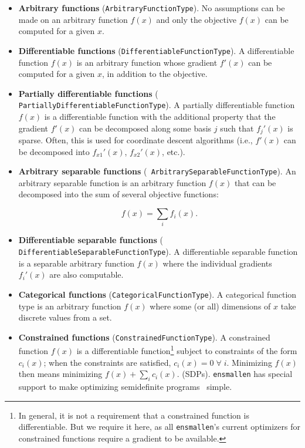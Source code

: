 \begin{itemize}
\item {\bf Arbitrary functions} ({\tt \small ArbitraryFunctionType}).  No
assumptions can be made on an arbitrary function $f(x)$ and only the objective
$f(x)$ can be computed for a given $x$.

\item {\bf Differentiable functions} ({\tt \small DifferentiableFunctionType}).
A differentiable function $f(x)$ is an arbitrary function whose gradient $f'(x)$
can be computed for a given $x$, in addition to the objective.

\item {\bf Partially differentiable functions} ({\tt \small
PartiallyDifferentiableFunctionType}).  A partially differentiable function
$f(x)$ is a differentiable function with the additional property that the
gradient $f'(x)$ can be decomposed along some basis $j$ such that $f_j'(x)$ is
sparse.  Often, this is used for coordinate descent algorithms (i.e., $f'(x)$
can be decomposed into $f_{x1}'(x)$, $f_{x2}'(x)$, etc.).

\item {\bf Arbitrary separable functions} ({\tt \small
ArbitrarySeparableFunctionType}).  An arbitrary separable function is an
arbitrary function $f(x)$ that can be decomposed into the sum of several
objective functions:

\begin{equation}
f(x) = \sum_i f_i(x).
\end{equation}

\item {\bf Differentiable separable functions} ({\tt \small
DifferentiableSeparableFunctionType}).  A differentiable separable function is a
separable arbitrary function $f(x)$ where the individual gradients $f_i'(x)$ are
also computable.

\item {\bf Categorical functions} ({\tt \small CategoricalFunctionType}).  A
categorical function type is an arbitrary function $f(x)$ where some (or all)
dimensions of $x$ take discrete values from a set.

\item {\bf Constrained functions} ({\tt \small ConstrainedFunctionType}).  A
constrained function $f(x)$ is a differentiable function\footnote{In general, it
is not a requirement that a constrained function is differentiable.  But we
require it here, as all {\tt ensmallen}'s current optimizers for constrained
functions require a gradient to be available.} subject to constraints of the
form $c_i(x)$; when the constraints are satisfied, $c_i(x) = 0\; \forall \; i$.
Minimizing $f(x)$ then means minimizing $f(x) + \sum_i c_i(x)$.
   (SDPs).  {\tt ensmallen} has special
support to make optimizing semidefinite
programs~\cite{vandenberghe1996semidefinite} simple.
\end{itemize}

